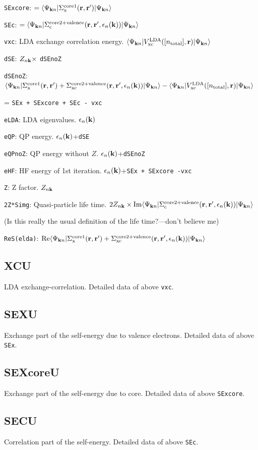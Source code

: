 \documentclass[a4paper,10pt,epsf,fleqn]{article}
\newcommand{\fx}[1]{\subsection{\sf #1\index{\sf #1}}}
\begin{document}
{{\tt SExcore}: $= \langle\Psi_{{\bf k}n}|\Sigma_{\rm x}^{\rm core1}({\bf r},{\bf r}^{\prime})|\Psi_{{\bf k}n}\rangle$

{\tt SEc}: $ = \langle\Psi_{{\bf k}n}|\Sigma_{\rm c}^{\rm core2+valence}({\bf r},{\bf r}^{\prime},\epsilon_n({\bf k}))|\Psi_{{\bf k}n}\rangle$

{\tt vxc}: LDA exchange correlation energy.
$\langle\Psi_{{\bf k}n}|V_{\rm xc}^{\rm LDA}([n_{\rm total}],{\bf r})|\Psi_{{\bf k}n}\rangle$

{\tt dSE}: $Z_{n{\bf k}}\times$ {\tt dSEnoZ}

{\tt dSEnoZ}: $
\langle\Psi_{{\bf k}n}|
\Sigma_{\rm x}^{\rm core1}({\bf r},{\bf r}^{\prime})+
\Sigma_{\rm xc}^{\rm core2+valence}({\bf r},{\bf r}^{\prime},\epsilon_n({\bf k}))
|\Psi_{{\bf k}n}\rangle 
- \langle\Psi_{{\bf k}n}|V_{\rm xc}^{\rm LDA}([n_{\rm total}],{\bf r})|\Psi_{{\bf k}n}\rangle$

\hspace{1cm} = {\tt SEx + SExcore + SEc - vxc}

{\tt eLDA}: LDA eigenvalues. $\epsilon_n({\bf k})$

{\tt eQP}: QP energy.  $\epsilon_n({\bf k})$+{\tt dSE}

{\tt eQPnoZ}: QP energy without $Z$. $\epsilon_n({\bf k})$+{\tt dSEnoZ}

{\tt eHF}: HF energy of 1st iteration. $\epsilon_n({\bf k})$+{\tt SEx + SExcore -vxc}

{\tt Z}: Z factor. $Z_{n{\bf k}}$

{\tt 2Z*Simg}: Quasi-particle life time. 
$2 Z_{n{\bf k}} \times {\rm Im}
\langle\Psi_{{\bf k}n}|
\Sigma_{\rm c}^{\rm core2+valence}({\bf r},{\bf r}^{\prime},\epsilon_n({\bf k}))
|\Psi_{{\bf k}n}\rangle$ 

(Is this really the usual definition of the life time?---don't believe me)

{\tt ReS(elda)}:
${\rm Re}
\langle\Psi_{{\bf k}n}|
\Sigma_{\rm x}^{\rm core1}({\bf r},{\bf r}^{\prime})+
\Sigma_{\rm xc}^{\rm core2+valence}({\bf r},{\bf r}^{\prime},\epsilon_n({\bf k}))
|\Psi_{{\bf k}n}\rangle$ 


\fx{XCU}
LDA exchange-correlation. 
Detailed data of above {\tt vxc}.

\fx{SEXU}
Exchange part of the self-energy due to valence electrons.
Detailed data of above {\tt SEx}.


\fx{SEXcoreU}
Exchange part of the self-energy due to core.
Detailed data of above {\tt SExcore}.

\fx{SECU}
Correlation part of the self-energy.
Detailed data of above {\tt SEc}.


}
\end{document}
